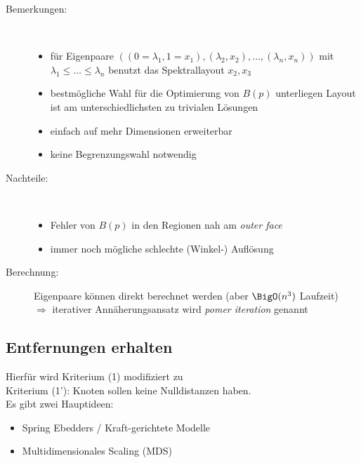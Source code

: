 \begin{description}
	\item[Bemerkungen:]\ \\ \vspace*{-\baselineskip}
		\begin{itemize}
			\item für Eigenpaare $((0=\lambda_1,1=x_1),(\lambda_2,x_2),\dots,(\lambda_n,x_n))$ mit $\lambda_1\leq \dots \leq \lambda_n$ benutzt das Spektrallayout $x_2,x_3$
			\item bestmögliche Wahl für die Optimierung von $B(p)$ unterliegen \glqq Layout ist am unterschiedlichsten zu trivialen Lösungen\grqq
			\item einfach auf mehr Dimensionen erweiterbar
			\item keine Begrenzungswahl notwendig
		\end{itemize}
	\item[Nachteile:]\ \\\vspace*{-\baselineskip}
		\begin{itemize}
			\item Fehler von $B(p)$ in den Regionen nah am \textit{outer face}
			\item immer noch mögliche schlechte (Winkel-) Auflösung
		\end{itemize}
	\item[Berechnung:] Eigenpaare können direkt berechnet werden (aber $\BigO(n^3)$ Laufzeit)\\
		$\Rightarrow$ iterativer Annäherungsansatz wird \textit{pomer iteration} genannt
\end{description}
\subsection{Entfernungen erhalten}
Hierfür wird Kriterium (1) modifiziert zu\\
Kriterium (1'): Knoten sollen keine Nulldistanzen haben.\\
Es gibt zwei Hauptideen:
\begin{itemize}
	\item Spring Ebedders / Kraft-gerichtete Modelle
	\item Multidimensionales Scaling (MDS)
\end{itemize}